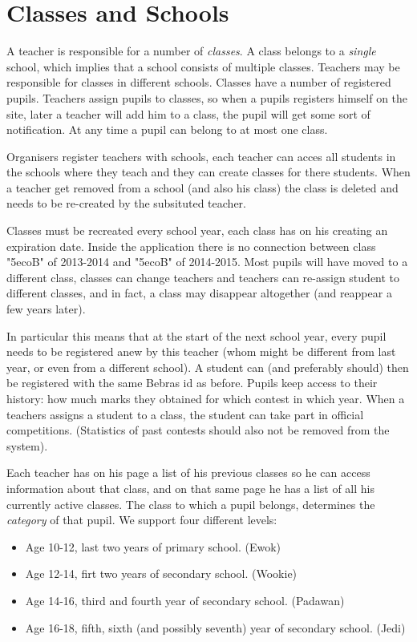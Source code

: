 
\section{Classes and Schools}

A teacher is responsible for a number of \emph{classes}. A class belongs to a \emph{single} school, which implies that a school consists of multiple classes. Teachers may be responsible for classes in different schools. Classes have a number of registered pupils. Teachers assign pupils to classes, so when a pupils registers himself on the site, later a teacher will add him to a class, the pupil will get some sort of notification. At any time a pupil can belong to at most one class. 

Organisers register teachers with schools, each teacher can acces all students in the schools where they teach and they can create classes for there students.
When a teacher get removed from a school (and also his class) the class is deleted and needs to be re-created by the subsituted teacher.

Classes must be recreated every school year, each class has on his creating an expiration date. Inside the application there is no connection between class "5ecoB" of 2013-2014 and "5ecoB" of 2014-2015. Most pupils will have moved to a different class, classes can change teachers and teachers can re-assign student to different classes, and in fact, a class may disappear altogether (and reappear a few years later).

In particular this means that at the start of the next school year, every pupil needs to be registered anew by this teacher (whom might be different from last year, or even from a different school). A student can (and preferably should) then be registered with the same Bebras id as before. Pupils keep access to their history: how much marks they obtained for which contest in which year. 
When a teachers assigns a student to a class, the student can take part in official competitions.
(Statistics of past contests should also not be removed from the system).

Each teacher has on his page a list of his previous classes so he can access information about that class, and on that same page he has a list of all his currently active classes. 
The class to which a pupil belongs, determines the \emph{category} of that pupil. We support four different levels: \label{levels}
\begin{itemize}
\item Age 10-12, last two years of primary school. (Ewok)
\item Age 12-14, firt two years of secondary school. (Wookie)
\item Age 14-16, third and fourth year of secondary school. (Padawan)
\item Age 16-18, fifth, sixth (and possibly seventh) year of secondary school. (Jedi)
\end{itemize}

